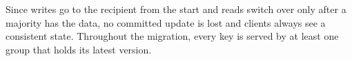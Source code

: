Since writes go to the recipient from the start and reads switch over only after a majority has the data, no committed update is lost and clients always see a consistent state.
Throughout the migration, every key is served by at least one group that holds its latest version.






